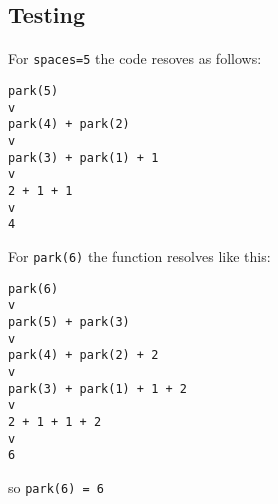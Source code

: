 \documentclass{report}
\begin{document}
\subsection*{Testing}
\paragraph{}
For \texttt{spaces=5} the code resoves as follows:
\begin{lstlisting}
park(5)
v
park(4) + park(2)
v
park(3) + park(1) + 1
v
2 + 1 + 1
v
4
\end{lstlisting}

For \texttt{park(6)} the function resolves like this:
\begin{lstlisting}
park(6)
v
park(5) + park(3)
v
park(4) + park(2) + 2
v
park(3) + park(1) + 1 + 2
v
2 + 1 + 1 + 2
v
6
\end{lstlisting}

so \texttt{park(6) = 6}
\end{document}
